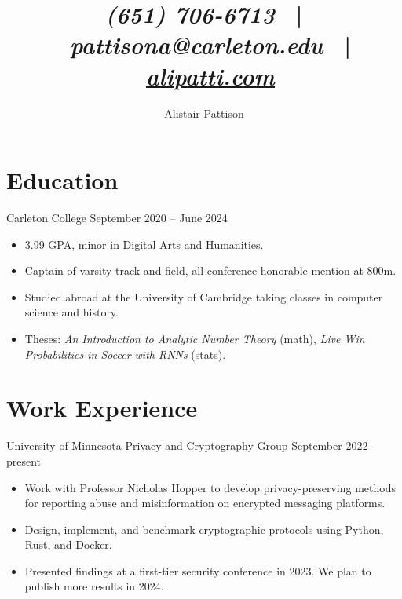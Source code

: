 \documentclass{resume}
\author{Alistair Pattison}
\title{
{\it (651) 706-6713}
\ | \
{\it pattisona@carleton.edu}
\ | \
\href{http://alipatti.com}{\it alipatti.com}
}
\begin{document}
\maketitle

\section{Education}

{Carleton College}
{September 2020 -- June 2024}

\begin{itemize}
	\item 3.99 GPA,  minor in Digital Arts and Humanities.
	\item Captain of varsity track and field, all-conference honorable mention at 800m.
	\item Studied abroad at the University of Cambridge taking classes in computer science and history.
	\item Theses:
	      \textit{An Introduction to Analytic Number Theory} (math),
	      \textit{Live Win Probabilities in Soccer with RNNs} (stats).
\end{itemize}

%

\section{Work Experience}

{University of Minnesota Privacy and Cryptography Group}
{September 2022 -- present}

\begin{itemize}
	\item Work with Professor Nicholas Hopper to develop privacy-preserving methods for reporting abuse and misinformation on encrypted messaging platforms.
	\item Design, implement, and benchmark cryptographic protocols using Python, Rust, and Docker.
	\item Presented findings at a first-tier security conference in 2023. We plan to publish more results in 2024.
\end{itemize}
\end{document}
